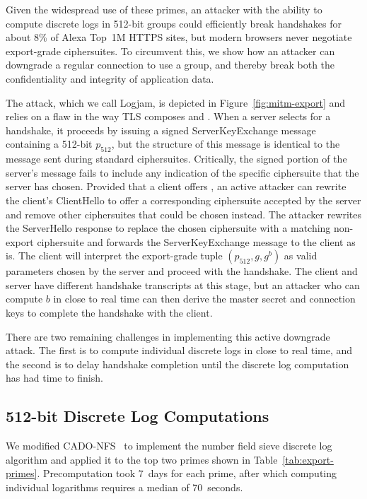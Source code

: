 Given the widespread use of these primes, an attacker with the ability to
compute discrete logs in 512-bit groups could efficiently break \dheexp{}
handshakes for about 8\% of Alexa Top~1M HTTPS sites, but modern browsers
never negotiate export-grade ciphersuites. To circumvent this, we show how an
attacker can downgrade a regular \dhe{} connection to use a \dheexp{} group,
and thereby break both the confidentiality and integrity of application data.

The attack, which we call Logjam, is depicted in Figure~\ref{fig:mitm-export}
and relies on a flaw in the way TLS composes \dhe{} and \dheexp{}. When a
server selects \dheexp{} for a handshake, it proceeds by issuing a signed
\textsf{ServerKeyExchange} message containing a 512-bit $p_{512}$, but the
structure of this message is identical to the message sent during standard
\dhe{} ciphersuites. Critically, the signed portion of the server's message
fails to include any indication of the specific ciphersuite that the server
has chosen. Provided that a client offers \dhe{}, an active attacker can
rewrite the client's \textsf{ClientHello} to offer a corresponding \dheexp{}
ciphersuite accepted by the server and remove other ciphersuites that could
be chosen instead. The attacker rewrites the \textsf{ServerHello} response to
replace the chosen \dheexp{} ciphersuite with a matching non-export
ciphersuite and forwards the \textsf{ServerKeyExchange} message to the client
as is. The client will interpret the export-grade tuple $(p_{512}, g, g^b)$
as valid \dhe{} parameters chosen by the server and proceed with the
handshake. The client and server have different handshake transcripts at this
stage, but an attacker who can compute $b$ in close to real time can then
derive the master secret and connection keys to complete the handshake with
the client.

There are two remaining challenges in implementing this active downgrade
attack. The first is to compute individual discrete logs in close to real
time, and the second is to delay handshake completion until the discrete log
computation has had time to finish.

\subsection{512-bit Discrete Log Computations}
\label{subsec:512bit-dl-computation}

We modified CADO-NFS~\cite{cado-nfs-2.3} to implement the number field sieve
discrete log algorithm and applied it to the top two \dheexp{} primes shown
in Table~\ref{tab:export-primes}. Precomputation took 7~days for each prime,
after which computing individual logarithms requires a median of 70~seconds.

